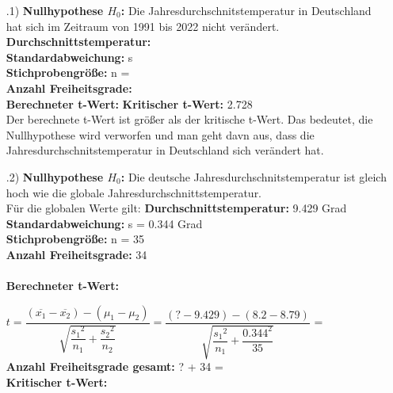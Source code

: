 \documentclass[12pt]{scrartcl}
\begin{document}
\exercise{}
\begin{itemize}
    \item[\theenumi.1)] \textbf{Nullhypothese $H_0$:} Die Jahresdurchschnitstemperatur in Deutschland hat sich 
                                                      im Zeitraum von 1991 bis 2022 nicht verändert.\\
                        \textbf{Durchschnittstemperatur:} \\
                        \textbf{Standardabweichung:} s \\
                        \textbf{Stichprobengröße:} n =\\
                        \textbf{Anzahl Freiheitsgrade:} \\
                        \textbf{Berechneter t-Wert:} 
                        \textbf{Kritischer t-Wert:} 2.728\\
                        Der berechnete t-Wert ist größer als der kritische t-Wert. Das bedeutet, die Nullhypothese wird verworfen und man geht davn aus,
                        dass die Jahresdurchschnitstemperatur in Deutschland sich verändert hat.
                        
	\item[\theenumi.2)] \textbf{Nullhypothese $H_0$:} Die deutsche Jahresdurchschnitstemperatur ist gleich hoch wie die globale Jahresdurchschnittstemperatur.\\
	Für die globalen Werte gilt:
						\textbf{Durchschnittstemperatur:} 9.429 Grad\\
                        \textbf{Standardabweichung:} s = 0.344 Grad \\
                        \textbf{Stichprobengröße:} n = 35\\
                        \textbf{Anzahl Freiheitsgrade:} 34 \\
                        \\
\textbf{Berechneter t-Wert:} 

$t=\dfrac{(\overline{x_{1}}-\overline{x_{2}}) - (\mu_{1}-\mu_{2})}{\sqrt{\dfrac{{s_{1}}^{2}}{n_1}+\dfrac{{s_{2}}^{2}}{n_2}}} 
=\dfrac{(? - 9.429)- (8.2-8.79)}{\sqrt{\dfrac{{s_{1}}^{2}}{n_1}+\dfrac{{0.344}^{2}}{35}}} $ =\\

\textbf{Anzahl Freiheitsgrade gesamt:} ? + 34 = \\
\textbf{Kritischer t-Wert:} \\
\end{itemize}
                        
                        
\end{document}
